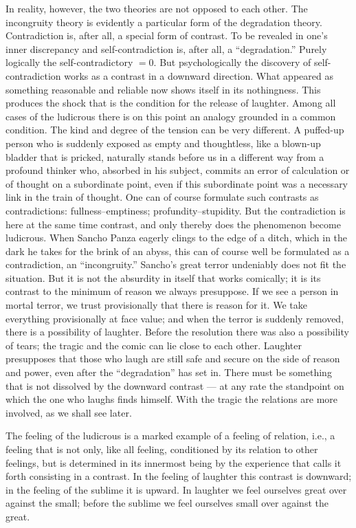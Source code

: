 \documentclass[12pt]{book}
\newcommand{\opage}[1]{\marginnote{\footnotesize\textit{[#1]}}}
\begin{document}
In reality, however, the two theories are not opposed to each other. The
incongruity theory is evidently a particular form of the degradation theory.
Contradiction is, after all, a special form of contrast. To be revealed in one's
inner discrepancy and self-contradiction is, after all, a ``degradation.''
Purely logically the self-contradictory $= 0$. But psychologically the discovery
of self-contradiction works as a contrast in a downward direction. What appeared
as something reasonable and reliable now shows itself in its nothingness. This
produces the shock that is the condition for the release of laughter. Among all
cases of the ludicrous there is on this point an analogy grounded in a common
condition. The kind and degree of the tension can be very different. A puffed-up
person who is suddenly exposed as empty and thoughtless, like a blown-up bladder
that is pricked, naturally stands before us in a different way from a profound
thinker who, absorbed in his subject, commits an error of calculation or of
thought on a \opage{50}subordinate point, even if this subordinate point was a
necessary link in the train of thought. One can of course formulate such contrasts
as contradictions: fullness--emptiness; profundity--stupidity. But the
contradiction is here at the same time contrast, and only thereby does the
phenomenon become ludicrous. When Sancho Panza eagerly clings to the edge of a
ditch, which in the dark he takes for the brink of an abyss, this can of course
well be formulated as a contradiction, an ``incongruity.'' Sancho's great terror
undeniably does not fit the situation. But it is not the absurdity in itself that
works comically; it is its contrast to the minimum of reason we always presuppose.
If we see a person in mortal terror, we trust provisionally that there is reason
for it. We take everything provisionally at face value; and when the terror is
suddenly removed, there is a possibility of laughter. Before the resolution there
was also a possibility of tears; the tragic and the comic can lie close to each
other. Laughter presupposes that those who laugh are still safe and secure on the
side of reason and power, even after the ``degradation'' has set in. There must be
something that is not dissolved by the downward contrast --- at any rate the
standpoint on which the one who laughs finds himself. With the tragic the
relations are more involved, as we shall see later.

The feeling of the ludicrous is a marked example of a feeling of relation, i.e., a
feeling that is not only, like all feeling, conditioned by its relation to other
feelings, but is determined in its innermost being by the experience that calls it
forth consisting in a contrast. In the feeling of laughter this contrast is
downward; in the feeling of the sublime it is upward. In laughter we feel ourselves
great over against the small; before the sublime we feel ourselves small over
against the great.
\end{document}
